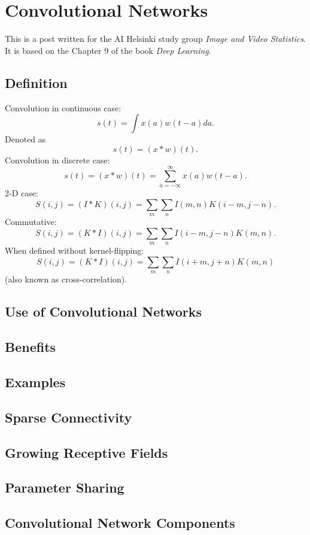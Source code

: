 \documentclass[]{article}
\begin{document}
\section{Convolutional Networks}
This is a post written for the AI Helsinki study group \emph{Image and Video Statistics}.
It is based on the Chapter 9 of the book \emph{Deep Learning}.


\subsection{Definition}
Convolution in continuous case:
\[
s(t) = \int x(a)w(t - a)da.
\]
Denoted as
\[
s(t) = (x * w)(t).
\]
Convolution in discrete case:
\[
s(t) = (x * w)(t) = \sum_{a = -\infty}^{\infty} x(a)w(t - a).
\]
2-D case:
\[
S(i, j) = (I * K)(i, j) = \sum_m \sum_n I(m , n) K(i - m, j - n).
\]
Commutative:
\[
S(i, j) = (K * I)(i, j) = \sum_m \sum_n I(i - m , j - n) K(m, n).
\]
When defined without kernel-flipping:
\[
S(i, j) = (K * I)(i, j) = \sum_m \sum_n I(i + m , j + n) K(m, n)
\]
(also known as cross-correlation).
\subsection{Use of Convolutional Networks}

\subsection{Benefits}

\subsection{Examples}

\subsection{Sparse Connectivity}

\subsection{Growing Receptive Fields}

\subsection{Parameter Sharing}

\subsection{Convolutional Network Components}
\end{document}
